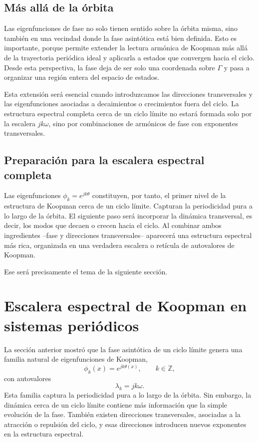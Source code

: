 \subsection{Más allá de la órbita}

Las eigenfunciones de fase no solo tienen sentido sobre la órbita misma, sino también en una vecindad donde la fase asintótica está bien definida. Esto es importante, porque permite extender la lectura armónica de Koopman más allá de la trayectoria periódica ideal y aplicarla a estados que convergen hacia el ciclo. Desde esta perspectiva, la fase deja de ser solo una coordenada sobre \(\Gamma\) y pasa a organizar una región entera del espacio de estados.

Esta extensión será esencial cuando introduzcamos las direcciones transversales y las eigenfunciones asociadas a decaimientos o crecimientos fuera del ciclo. La estructura espectral completa cerca de un ciclo límite no estará formada solo por la escalera \(jk\omega\), sino por combinaciones de armónicos de fase con exponentes transversales.

\subsection{Preparación para la escalera espectral completa}

Las eigenfunciones \(\phi_k=e^{jk\theta}\) constituyen, por tanto, el primer nivel de la estructura de Koopman cerca de un ciclo límite. Capturan la periodicidad pura a lo largo de la órbita. El siguiente paso será incorporar la dinámica transversal, es decir, los modos que decaen o crecen hacia el ciclo. Al combinar ambos ingredientes --fase y direcciones transversales-- aparecerá una estructura espectral más rica, organizada en una verdadera escalera o retícula de autovalores de Koopman.

Ese será precisamente el tema de la siguiente sección.

\section{Escalera espectral de Koopman en sistemas periódicos}

La sección anterior mostró que la fase asintótica de un ciclo límite genera una familia natural de eigenfunciones de Koopman,
\[
\phi_k(x)=e^{jk\theta(x)},
\qquad
k\in\mathbb{Z},
\]
con autovalores
\[
\lambda_k=jk\omega.
\]
Esta familia captura la periodicidad pura a lo largo de la órbita. Sin embargo, la dinámica cerca de un ciclo límite contiene más información que la simple evolución de la fase. También existen direcciones transversales, asociadas a la atracción o repulsión del ciclo, y esas direcciones introducen nuevos exponentes en la estructura espectral.

